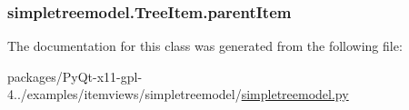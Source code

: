\subsubsection[{parent\+Item}]{\setlength{\rightskip}{0pt plus 5cm}simpletreemodel.\+Tree\+Item.\+parent\+Item}\label{classsimpletreemodel_1_1TreeItem_a8d93bb22a1c3a977f05c45d6766be391}


The documentation for this class was generated from the following file\+:\begin{DoxyCompactItemize}
\item 
packages/\+Py\+Qt-\/x11-\/gpl-\/4../examples/itemviews/simpletreemodel/\hyperlink{simpletreemodel_8py}{simpletreemodel.\+py}\end{DoxyCompactItemize}
